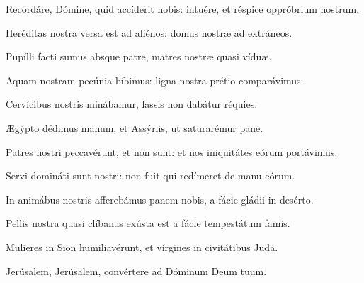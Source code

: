 
Recordáre, Dómine, quid accíderit nobis: intuére, et réspice oppróbrium nostrum.

Heréditas nostra versa est ad aliénos: domus nostræ ad extráneos.

Pupílli facti sumus absque patre, matres nostræ quasi víduæ.

Aquam nostram pecúnia bíbimus: ligna nostra prétio comparávimus.

Cervícibus nostris minábamur, lassis non dabátur réquies.

Ægýpto dédimus manum, et Assýriis, ut saturarémur pane.

Patres nostri peccavérunt, et non sunt: et nos iniquitátes eórum portávimus.

Servi domináti sunt nostri: non fuit qui redímeret de manu eórum.

In animábus nostris afferebámus panem nobis, a fácie gládii in desérto.

Pellis nostra quasi clíbanus exústa est a fácie tempestátum famis.

Mulíeres in Sion humiliavérunt, et vírgines in civitátibus Juda.

Jerúsalem, Jerúsalem, convértere ad Dóminum Deum tuum.
\par